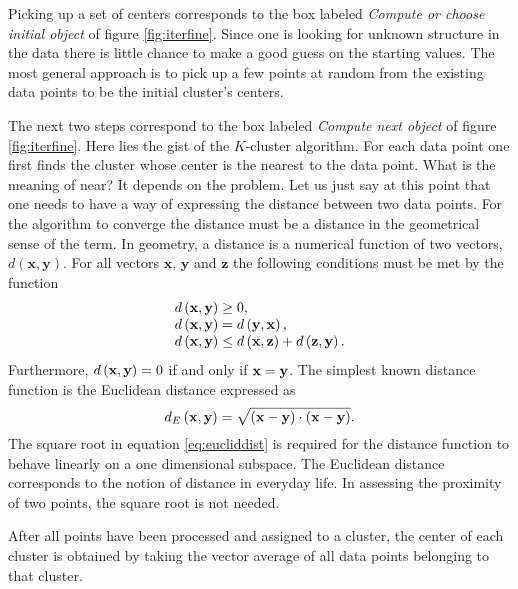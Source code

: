  Picking up a set of centers
corresponds to the box labeled \textsl{Compute or choose initial
object} of figure \ref{fig:iterfine}. Since one is looking for
unknown structure in the data there is little chance to make a
good guess on the starting values. The most general approach is to
pick up a few points at random from the existing data points to be
the initial cluster's centers.

The next two steps correspond to the box labeled \textsl{Compute next
object} of figure \ref{fig:iterfine}. Here lies the gist of the
$K$-cluster algorithm. For each data point one first finds the
cluster whose center is the nearest to the data point. What is the
meaning of near? It depends on the problem. Let us just say at
this point that one needs to have a way of expressing the distance
between two data points. For the algorithm to converge the
distance must be a distance in the geometrical sense of the term.
In geometry, a distance is a numerical function of two vectors,
$d\left(\textbf{x},\textbf{y}\right)$. For all vectors $\textbf{x}$, $\textbf
{y}$ and $\textbf{z}$ the following conditions must be met by the
function
\begin{equation}
\nonumber
\begin{array}{l}
 d\left({\textbf x},{\textbf y}\right) \geq 0, \\
 d\left({\textbf x},{\textbf y}\right) = d\left({\textbf y},{\textbf x}\right), \\
 d\left({\textbf x},{\textbf y}\right) \leq d\left({\textbf x},{\textbf z}\right)
 + d\left({\textbf z},{\textbf y}\right).
\end{array}
\end{equation}
Furthermore, $d\left({\textbf x},{\textbf y}\right)=0$ if and only if
${\textbf x}={\textbf y}$. The simplest known distance function is the
Euclidean distance expressed as
\begin{equation}
\label{eq:eucliddist}
 d_E\left({\textbf x},{\textbf y}\right) = \sqrt{\left({\textbf x}-{\textbf y}\right)\cdot\left({\textbf x}-{\textbf
 y}\right)}.
\end{equation}
The square root in equation \ref{eq:eucliddist} is required for
the distance function to behave linearly on a one dimensional
subspace. The Euclidean distance corresponds to the notion of
distance in everyday life. In assessing the proximity of two
points, the square root is not needed.

After all points have been processed and assigned to a cluster,
the center of each cluster is obtained by taking the vector
average of all data points belonging to that cluster.

